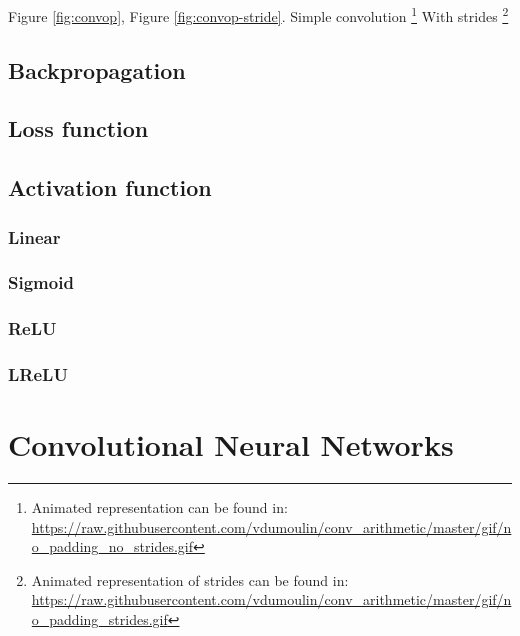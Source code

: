 Figure \ref{fig:convop}, Figure \ref{fig:convop-stride}. Simple convolution \footnote{Animated representation can be found in: \url{https://raw.githubusercontent.com/vdumoulin/conv_arithmetic/master/gif/no_padding_no_strides.gif}}
With strides \footnote{Animated representation of strides can be found in: \url{https://raw.githubusercontent.com/vdumoulin/conv_arithmetic/master/gif/no_padding_strides.gif}}



\subsection{Backpropagation}


%


\subsection{Loss function}
\subsection{Activation function}
\subsubsection{Linear}
\subsubsection{Sigmoid}
\subsubsection{ReLU}
\subsubsection{LReLU}
\section{Convolutional Neural Networks}
